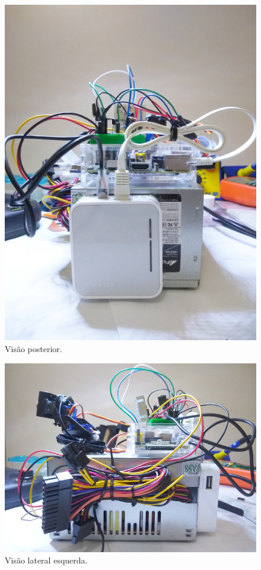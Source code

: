 \begin{apendicesenv}
\begin{figure}[H]
	\centering
	\includegraphics[width=1\linewidth]{figuras/vista_traseira}
	\caption{Visão posterior.}
	\label{fig:vistatraseira}
\end{figure}

\begin{figure}[H]
	\centering
	\includegraphics[width=1\linewidth]{figuras/vista_esquerda}
	\caption{Visão lateral esquerda.}
	\label{fig:vistaesquerda}
\end{figure}


\end{apendicesenv}
